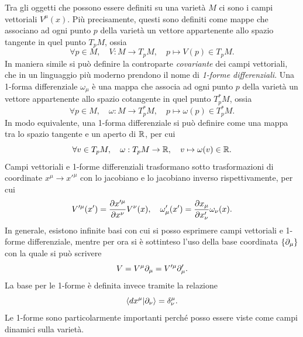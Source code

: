 Tra gli oggetti che possono essere definiti su una varietà $M$ ci sono i campi vettoriali $V^\mu(x)$. Più precisamente, questi sono definiti come mappe che associano ad ogni punto $p$ della varietà un vettore appartenente allo spazio tangente in quel punto $T_pM$, ossia
\begin{equation}
    \forall p \in M,\quad V : M \to T_pM,\quad p \mapsto V(p) \in T_pM.
\end{equation}
In maniera simile si può definire la controparte \emph{covariante} dei campi vettoriali, che in un linguaggio più moderno prendono il nome di \emph{1-forme differenziali}. Una 1-forma differenziale $\omega_\mu$ è una mappa che associa ad ogni punto $p$ della varietà un vettore appartenente allo spazio cotangente in quel punto $T_p^*M$, ossia
\begin{equation}
    \forall p \in M,\quad \omega : M \to T_p^*M,\quad p \mapsto \omega(p) \in T_p^*M.
\end{equation}
In modo equivalente, una 1-forma differenziale si può definire come una mappa tra lo spazio tangente e un aperto di $\mathbb{R}$, per cui
\begin{equation}
    \forall v \in T_pM,\quad \omega : T_pM \to \mathbb{R},\quad v \mapsto \omega(v) \in \mathbb{R}.    
\end{equation}
Campi vettoriali e 1-forme differenziali trasformano sotto trasformazioni di coordinate $x^\mu \to x'^\mu$ con lo jacobiano e lo jacobiano inverso rispettivamente, per cui
\begin{equation}
    V'^\mu(x') = \frac{\partial x'^\mu}{\partial x^\nu}V^\nu(x),\quad \omega'_\mu(x') = \frac{\partial x_\mu}{\partial x'_\nu}\omega_\nu(x).
\end{equation}
In generale, esistono infinite basi con cui si posso esprimere campi vettoriali e 1-forme differenziale, mentre per ora si è sottinteso l'uso della base coordinata $\{\partial_\mu\}$ con la quale si può scrivere 
\begin{equation}
    V = V^\mu\partial_\mu = V'^\mu\partial'_\mu.
\end{equation}
La base per le 1-forme è definita invece tramite la relazione
\begin{equation}
    \langle dx^\mu | \partial_\nu \rangle = \delta^\mu_\nu.
\end{equation}
Le 1-forme sono particolarmente importanti perché posso essere viste come campi dinamici sulla varietà. 

